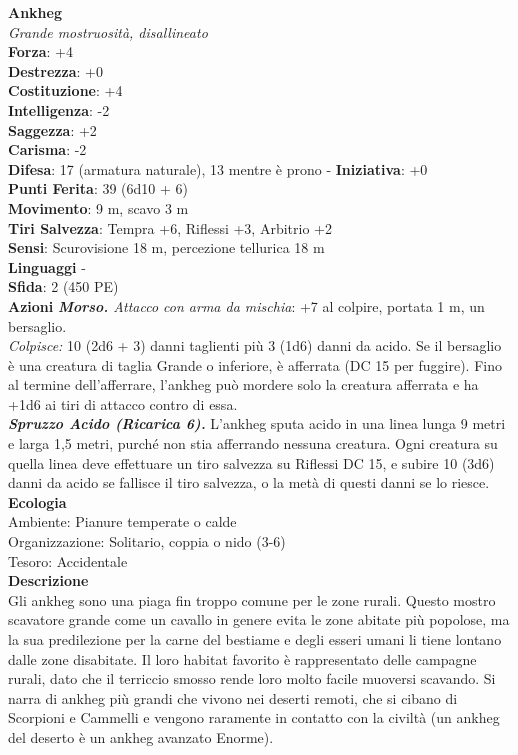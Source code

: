 \begin{multicols}{2}
\medskip\textbf{Ankheg}\\
\emph{Grande mostruosità, disallineato}\\
\textbf{Forza}: +4\\
\textbf{Destrezza}: +0\\
\textbf{Costituzione}: +4\\
\textbf{Intelligenza}: -2\\
\textbf{Saggezza}: +2\\
\textbf{Carisma}: -2\\
\textbf{Difesa}: 17 (armatura naturale), 13 mentre è prono - \textbf{Iniziativa}: +0\\
\textbf{Punti Ferita}: 39 (6d10 + 6)\\
\textbf{Movimento}: 9 m, scavo 3 m\\
\textbf{Tiri Salvezza}: Tempra +6, Riflessi +3, Arbitrio +2\\
\textbf{Sensi}: Scurovisione 18 m, percezione tellurica 18 m\\
\textbf{Linguaggi} -\\
\textbf{Sfida}: 2 (450 PE)\smallskip\\
\smallskip\textbf{Azioni}
\emph{\textbf{Morso.} Attacco con arma da mischia}: +7 al colpire, portata 1 m, un bersaglio.\\
\emph{Colpisce:} 10 (2d6 + 3) danni taglienti più 3 (1d6) danni da acido. Se il bersaglio è una creatura di taglia Grande o inferiore, è afferrata (DC  15 per fuggire). Fino al termine dell'afferrare, l'ankheg può mordere solo la creatura afferrata e ha +1d6 ai tiri di attacco contro di essa.\\
\emph{\textbf{Spruzzo Acido (Ricarica 6).}} L'ankheg sputa acido in una linea lunga 9 metri e larga 1,5 metri, purché non stia afferrando nessuna creatura. Ogni creatura su quella linea deve effettuare un tiro salvezza su Riflessi DC  15, e subire 10 (3d6) danni da acido se fallisce il tiro salvezza, o la metà di questi danni se lo riesce.\\
\textbf{Ecologia}\\
Ambiente: Pianure temperate o calde\\
Organizzazione: Solitario, coppia o nido (3-6)\\
Tesoro: Accidentale\\
\textbf{Descrizione}\\
Gli ankheg sono una piaga fin troppo comune per le zone rurali. Questo mostro scavatore grande come un cavallo in genere evita le zone abitate più popolose, ma la sua predilezione per la carne del bestiame e degli esseri umani li tiene lontano dalle zone disabitate. Il loro habitat favorito è rappresentato delle campagne rurali, dato che il terriccio smosso rende loro molto facile muoversi scavando. Si narra di ankheg più grandi che vivono nei deserti remoti, che si cibano di Scorpioni e Cammelli e vengono raramente in contatto con la civiltà (un ankheg del deserto è un ankheg avanzato Enorme).\\

\end{multicols}
